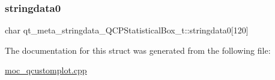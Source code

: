 \subsubsection{\texorpdfstring{stringdata0}{stringdata0}}
{\footnotesize\ttfamily char qt\+\_\+meta\+\_\+stringdata\+\_\+\+Q\+C\+P\+Statistical\+Box\+\_\+t\+::stringdata0\mbox{[}120\mbox{]}}



The documentation for this struct was generated from the following file\+:\begin{DoxyCompactItemize}
\item 
\mbox{\hyperlink{moc__qcustomplot_8cpp}{moc\+\_\+qcustomplot.\+cpp}}\end{DoxyCompactItemize}

